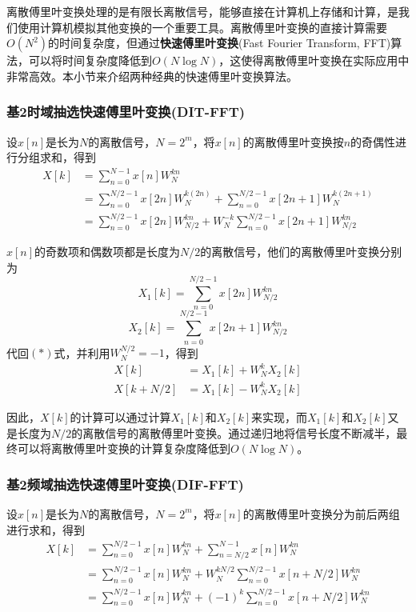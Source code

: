 离散傅里叶变换处理的是有限长离散信号，能够直接在计算机上存储和计算，是我们使用计算机模拟其他变换的一个重要工具。离散傅里叶变换的直接计算需要$O(N^2)$的时间复杂度，但通过\textbf{快速傅里叶变换}(Fast Fourier Transform, FFT)算法，可以将时间复杂度降低到$O(N\log N)$，这使得离散傅里叶变换在实际应用中非常高效。本小节来介绍两种经典的快速傅里叶变换算法。

\subsubsection{基2时域抽选快速傅里叶变换(DIT-FFT)}

设$x[n]$是长为$N$的离散信号，$N=2^m$，将$x[n]$的离散傅里叶变换按$n$的奇偶性进行分组求和，得到
\begin{align*}
X[k]&=\sum_{n=0}^{N-1}x[n]W_N^{kn}\\
&=\sum_{n=0}^{N/2-1}x[2n]W_N^{k(2n)}+\sum_{n=0}^{N/2-1}x[2n+1]W_N^{k(2n+1)}\\
&=\sum_{n=0}^{N/2-1}x[2n]W_{N/2}^{kn}+W_N^{-k}\sum_{n=0}^{N/2-1}x[2n+1]W_{N/2}^{kn}\tag{$*$}
\end{align*}

$x[n]$的奇数项和偶数项都是长度为$N/2$的离散信号，他们的离散傅里叶变换分别为$$X_1[k]=\sum_{n=0}^{N/2-1}x[2n]W_{N/2}^{kn}$$
$$X_2[k]=\sum_{n=0}^{N/2-1}x[2n+1]W_{N/2}^{kn}$$
代回$(*)$式，并利用$W_N^{N/2}=-1$，得到
\begin{align*}
X[k]&=X_1[k]+W_N^{k}X_2[k]\\
X[k+N/2]&=X_1[k]-W_N^{k}X_2[k]
\end{align*}

因此，$X[k]$的计算可以通过计算$X_1[k]$和$X_2[k]$来实现，而$X_1[k]$和$X_2[k]$又是长度为$N/2$的离散信号的离散傅里叶变换。通过递归地将信号长度不断减半，最终可以将离散傅里叶变换的计算复杂度降低到$O(N\log N)$。

\subsubsection{基2频域抽选快速傅里叶变换(DIF-FFT)}

设$x[n]$是长为$N$的离散信号，$N=2^m$，将$x[n]$的离散傅里叶变换分为前后两组进行求和，得到
\begin{align*}
X[k]&=\sum_{n=0}^{N/2-1}x[n]W_N^{kn}+\sum_{n=N/2}^{N-1}x[n]W_N^{kn}\\
&=\sum_{n=0}^{N/2-1}x[n]W_N^{kn}+W_N^{kN/2}\sum_{n=0}^{N/2-1}x[n+N/2]W_N^{kn}\\
&=\sum_{n=0}^{N/2-1}x[n]W_N^{kn}+(-1)^k\sum_{n=0}^{N/2-1}x[n+N/2]W_N^{kn}\tag{$**$}
\end{align*}

